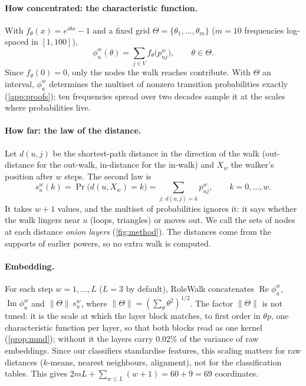 \documentclass[10pt]{article}
\theoremstyle{definition}
\newcommand{\Th}{\Theta}
\newcommand{\nTh}{\lVert\Theta\rVert}
\begin{document}
\paragraph{How concentrated: the characteristic function.}
With $f_\theta(x) = e^{i\theta x} - 1$ and a fixed grid $\Th = \{\theta_1,\dots,\theta_m\}$ ($m=10$ frequencies log-spaced in $[1,100]$),
\begin{equation}\label{eq:phi}
\phi^w_u(\theta) = \sum_{j\in V} f_\theta\big(p^w_{uj}\big), \qquad \theta \in \Th.
\end{equation}
Since $f_\theta(0)=0$, only the nodes the walk reaches contribute.
With $\Th$ an interval, $\phi^w_u$ determines the multiset of nonzero transition probabilities exactly (\cref{app:proofs}); ten frequencies spread over two decades sample it at the scales where probabilities live.

\paragraph{How far: the law of the distance.}
Let $d(u,j)$ be the shortest-path distance in the direction of the walk (out-distance for the out-walk, in-distance for the in-walk) and $X_w$ the walker's position after $w$ steps. The second law is
\begin{equation}\label{eq:layers}
s^w_u(k) = \Pr\big(d(u,X_w) = k\big) = \sum_{j:\,d(u,j)=k} p^w_{uj}, \qquad k = 0,\dots,w .
\end{equation}
It takes $w+1$ values, and the multiset of probabilities ignores it: it says whether the walk lingers near $u$ (loops, triangles) or moves out.
We call the sets of nodes at each distance \emph{onion layers} (\cref{fig:method}). The distances come from the supports of earlier powers, so no extra walk is computed.

\paragraph{Embedding.}
For each step $w = 1,\dots,L$ ($L = 3$ by default), RoleWalk concatenates $\operatorname{Re}\phi^w_u$, $\operatorname{Im}\phi^w_u$ and $\nTh\, s^w_u$, where $\nTh = (\sum_\theta \theta^2)^{1/2}$.
The factor $\nTh$ is not tuned: it is the scale at which the layer block matches, to first order in $\theta p$, one characteristic function per layer, so that both blocks read as one kernel (\cref{prop:mmd}); without it the layers carry 0.02\% of the variance of raw embeddings. Since our classifiers standardise features, this scaling matters for raw distances ($k$-means, nearest neighbours, alignment), not for the classification tables.
This gives $2mL + \sum_{w\le L}(w+1) = 60 + 9 = 69$ coordinates.
\end{document}

